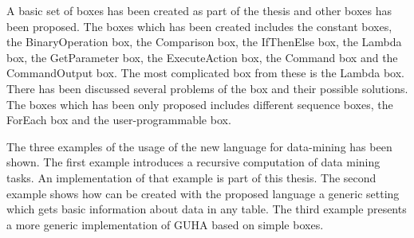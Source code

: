 \documentclass[a4paper,12pt]{book}
\begin{document}
A basic set of boxes has been created as part of the thesis and other boxes has been proposed. The boxes which has been created includes the constant boxes, the BinaryOperation box, the Comparison box, the IfThenElse box, the Lambda box, the GetParameter box, the ExecuteAction box, the Command box and the CommandOutput box. The most complicated box from these is the Lambda box. There has been discussed several problems of the box and their possible solutions. The boxes which has been only proposed includes different sequence boxes, the ForEach box and the user-programmable box.

The three examples of the usage of the new language for data-mining has been shown. The first example introduces a recursive computation of data mining tasks. An implementation of that example is part of this thesis. The second example shows how can be created with the proposed language a generic setting which gets basic information about data in any table. The third example presents a more generic implementation of GUHA based on simple boxes.



%
%
%




\end{document}
